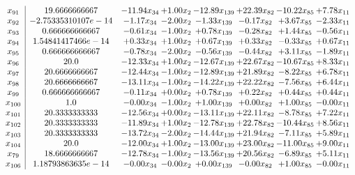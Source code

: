 \documentclass[8pt]{article}
\begin{document}
\[\begin{array}{c| c c@{\hskip 2pt} c@{\hskip 2pt} c@{\hskip 2pt} c@{\hskip 2pt} c@{\hskip 2pt} c@{\hskip 2pt} }
 x_{91}   &  19.6666666667 & -11.94 x_{34} & +  1.00 x_{2} & -12.89 x_{139} & + 22.39 x_{82} & -10.22 x_{85} & +  7.78 x_{11}\\
 x_{92}   &  -2.75335310107e-14 & -1.17 x_{34} & -2.00 x_{2} & -1.33 x_{139} & -0.17 x_{82} & +  3.67 x_{85} & -2.33 x_{11}\\
 x_{93}   &  0.666666666667 & -0.61 x_{34} & -1.00 x_{2} & +  0.78 x_{139} & -0.28 x_{82} & +  1.44 x_{85} & -0.56 x_{11}\\
 x_{94}   &  1.54841417466e-14 & +  0.33 x_{34} & +  1.00 x_{2} & +  0.67 x_{139} & +  0.33 x_{82} & -0.33 x_{85} & +  0.67 x_{11}\\
 x_{95}   &  0.666666666667 & -0.78 x_{34} & -2.00 x_{2} & -0.56 x_{139} & -0.44 x_{82} & +  3.11 x_{85} & -1.89 x_{11}\\
 x_{96}   &  20.0 & -12.33 x_{34} & +  1.00 x_{2} & -12.67 x_{139} & + 22.67 x_{82} & -10.67 x_{85} & +  8.33 x_{11}\\
 x_{97}   &  20.6666666667 & -12.44 x_{34} & -1.00 x_{2} & -12.89 x_{139} & + 21.89 x_{82} & -8.22 x_{85} & +  6.78 x_{11}\\
 x_{98}   &  20.6666666667 & -13.11 x_{34} & -1.00 x_{2} & -14.22 x_{139} & + 22.22 x_{82} & -7.56 x_{85} & +  6.44 x_{11}\\
 x_{99}   &  0.666666666667 & -0.11 x_{34} & +  0.00 x_{2} & +  0.78 x_{139} & +  0.22 x_{82} & +  0.44 x_{85} & +  0.44 x_{11}\\
 x_{100}   &  1.0 & -0.00 x_{34} & -1.00 x_{2} & +  1.00 x_{139} & +  0.00 x_{82} & +  1.00 x_{85} & -0.00 x_{11}\\
 x_{101}   &  20.3333333333 & -12.56 x_{34} & +  0.00 x_{2} & -13.11 x_{139} & + 22.11 x_{82} & -8.78 x_{85} & +  7.22 x_{11}\\
 x_{102}   &  20.3333333333 & -11.89 x_{34} & +  1.00 x_{2} & -12.78 x_{139} & + 22.78 x_{82} & -10.44 x_{85} & +  8.56 x_{11}\\
 x_{103}   &  20.3333333333 & -13.72 x_{34} & -2.00 x_{2} & -14.44 x_{139} & + 21.94 x_{82} & -7.11 x_{85} & +  5.89 x_{11}\\
 x_{104}   &  20.0 & -12.00 x_{34} & +  1.00 x_{2} & -13.00 x_{139} & + 23.00 x_{82} & -11.00 x_{85} & +  9.00 x_{11}\\
 x_{79}   &  18.6666666667 & -12.78 x_{34} & -1.00 x_{2} & -13.56 x_{139} & + 20.56 x_{82} & -6.89 x_{85} & +  5.11 x_{11}\\
 x_{106}   &  1.18793863635e-14 & -0.00 x_{34} & -0.00 x_{2} & +  0.00 x_{139} & -0.00 x_{82} & +  1.00 x_{85} & -0.00 x_{11}\\

\end{array}\]
\end{document}
